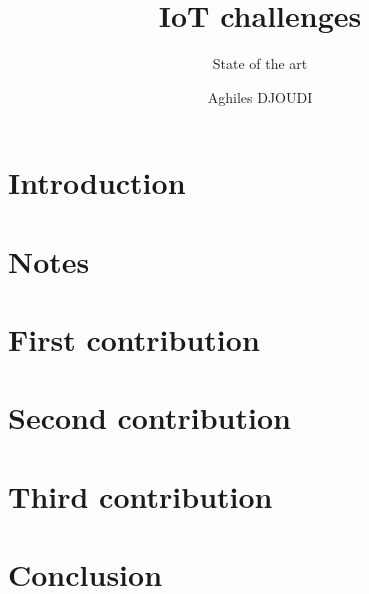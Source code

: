 \documentclass[8pt]{beamer}
\title{IoT challenges}
\subtitle{State of the art}
\author{Aghiles DJOUDI}
\institute{LIGM/ESIEE Paris}
\begin{document}
\firstpage

\section{Introduction}
		

\tableofcontent

\section{Notes}
	
	
	
	
	

\section{First contribution}
	
	
	
	
	

\section{Second contribution}
		
		
		
		
		

\section{Third contribution}
		
		
		
		
		

\section{Conclusion}
		


\frameBibliography
\end{document}
